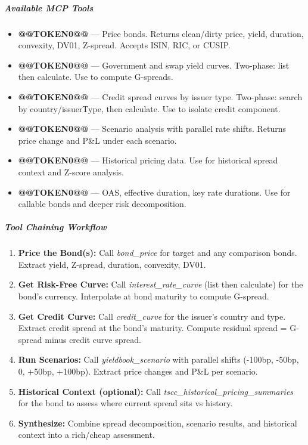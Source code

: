 \documentclass[11pt]{article}
\begin{document}
\subparagraph{Available MCP Tools}\mbox{}\par

\begin{itemize}[leftmargin=*,itemsep=2pt,topsep=2pt]
\item {} \textbf{@@TOKEN0@@} — Price bonds. Returns clean/dirty price, yield, duration, convexity, DV01, Z-spread. Accepts ISIN, RIC, or CUSIP.
\item {} \textbf{@@TOKEN0@@} — Government and swap yield curves. Two-phase: list then calculate. Use to compute G-spreads.
\item {} \textbf{@@TOKEN0@@} — Credit spread curves by issuer type. Two-phase: search by country/issuerType, then calculate. Use to isolate credit component.
\item {} \textbf{@@TOKEN0@@} — Scenario analysis with parallel rate shifts. Returns price change and P\&L under each scenario.
\item {} \textbf{@@TOKEN0@@} — Historical pricing data. Use for historical spread context and Z-score analysis.
\item {} \textbf{@@TOKEN0@@} — OAS, effective duration, key rate durations. Use for callable bonds and deeper risk decomposition.
\end{itemize}

\subparagraph{Tool Chaining Workflow}\mbox{}\par

\begin{enumerate}[leftmargin=*,itemsep=2pt,topsep=2pt]
\item {} \textbf{Price the Bond(s):} Call \emph{bond\_\allowbreak{}price} for target and any comparison bonds. Extract yield, Z-spread, duration, convexity, DV01.
\item {} \textbf{Get Risk-Free Curve:} Call \emph{interest\_\allowbreak{}rate\_\allowbreak{}curve} (list then calculate) for the bond's currency. Interpolate at bond maturity to compute G-spread.
\item {} \textbf{Get Credit Curve:} Call \emph{credit\_\allowbreak{}curve} for the issuer's country and type. Extract credit spread at the bond's maturity. Compute residual spread = G-spread minus credit curve spread.
\item {} \textbf{Run Scenarios:} Call \emph{yieldbook\_\allowbreak{}scenario} with parallel shifts (-100bp, -50bp, 0, +50bp, +100bp). Extract price changes and P\&L per scenario.
\item {} \textbf{Historical Context (optional):} Call \emph{tscc\_\allowbreak{}historical\_\allowbreak{}pricing\_\allowbreak{}summaries} for the bond to assess where current spread sits vs history.
\item {} \textbf{Synthesize:} Combine spread decomposition, scenario results, and historical context into a rich/cheap assessment.
\end{enumerate}
\end{document}

